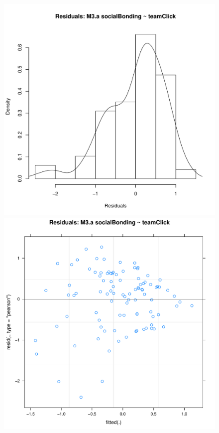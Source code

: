 {\begin{figure}[htbp]
  \includegraphics[scale =.4]{images/MLM3aHist.pdf}
  \includegraphics[scale =.4]{images/MLM3aScatter.pdf}

\end{figure}}
